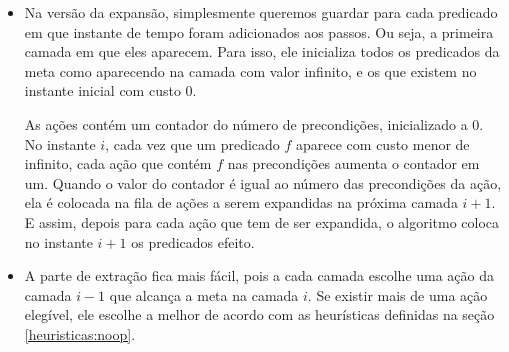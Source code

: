 \begin{itemize}
\item Na versão da expansão, simplesmente queremos guardar para cada predicado em que instante de tempo foram adicionados aos passos. Ou seja, a primeira camada em que eles aparecem. 
Para isso, ele inicializa todos os predicados da meta como aparecendo na camada com valor infinito, e os que existem no instante inicial com custo 0.

As ações contém um contador do número de precondições, inicializado a 0. No instante $i$, cada vez que um predicado $f$ aparece com custo menor de infinito, cada ação que contém $f$ nas precondições aumenta o contador em um.
Quando o valor do contador é igual ao número das precondições da ação, ela é colocada na fila de ações a serem expandidas na próxima camada $i+1$.
E assim, depois para cada ação que tem de ser expandida, o algoritmo coloca no instante $i+1$ os predicados efeito.

\item A parte de extração fica mais fácil, pois a cada camada escolhe uma ação da camada $i-1$ que alcança a meta na camada $i$. Se existir mais de uma ação elegível, ele escolhe a melhor de acordo com as heurísticas definidas na seção \ref{heuristicas:noop}.
\end{itemize}
